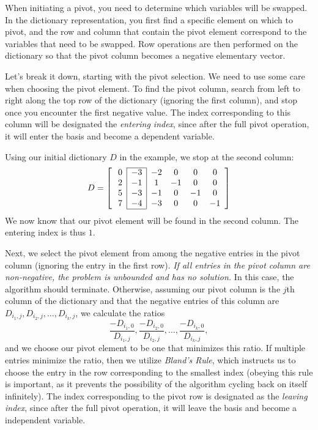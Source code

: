 When initiating a pivot, you need to determine which variables will be swapped.
In the dictionary representation, you first find a specific element on which to pivot, and the row and column that contain the pivot element correspond to the variables that need to be swapped.
Row operations are then performed on the dictionary so that the pivot column becomes a negative elementary vector.

Let's break it down, starting with the pivot selection.
We need to use some care when choosing the pivot element.
To find the pivot column, search from left to right along the top row of the dictionary (ignoring the first column), and stop once you encounter the first negative value.
The index corresponding to this column will be designated the \emph{entering index}, since after the full pivot operation, it will enter
the basis and become a dependent variable.

Using our initial dictionary $D$ in the example, we stop at the second column:
\[ D = \left[ \:
\begin{array}{*{7}{c}}
\cline{2-2}
0 & \multicolumn{1}{|c}{-3} & \multicolumn{1}{|c}{-2} & 0 & 0 & 0\\
2 & \multicolumn{1}{|c}{-1} & \multicolumn{1}{|c}{1} & -1 & 0 & 0\\
5 & \multicolumn{1}{|c}{-3} & \multicolumn{1}{|c}{-1} & 0 & -1 & 0\\
7 & \multicolumn{1}{|c}{-4} & \multicolumn{1}{|c}{-3} & 0 & 0 & -1\\
\cline{2-2}
\end{array}
\right] \]
We now know that our pivot element will be found in the second column.
The entering index is thus $1$.

Next, we select the pivot element from among the negative entries in the pivot column (ignoring the entry in the first row).
\emph{If all entries in the pivot column are non-negative, the problem is unbounded and has no solution.}
In this case, the algorithm should terminate.
Otherwise, assuming our pivot column is the $j$th column of the dictionary and that the negative entries of this column are
$D_{i_1, j}, D_{i_2, j}, \ldots, D_{i_k, j}$, we calculate the ratios
\[
\frac{-D_{i_1,0}}{D_{i_1,j}}, \frac{-D_{i_2,0}}{D_{i_2,j}}, \ldots, \frac{-D_{i_k,0}}{D_{i_k,j}},
\]
and we choose our pivot element to be one that minimizes this ratio.
If multiple entries minimize the ratio, then we utilize \emph{Bland's Rule}, which instructs us to choose the entry in the row corresponding to the smallest index (obeying this rule is important, as it prevents the possibility of the algorithm cycling back on itself infinitely).
The index corresponding to the pivot row is designated as the \emph{leaving index}, since after the full pivot operation, it will leave the basis and become a independent variable.


